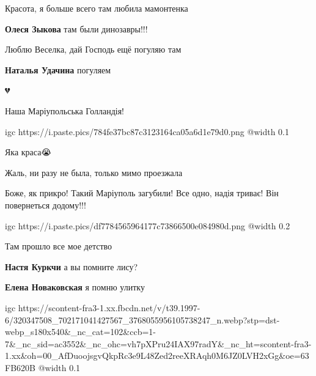  
 
 
 
 

\qqSecCmt


Красота, я больше всего там любила мамонтенка

\textbf{Олеся Зыкова} там были динозавры!!!


Люблю Веселка, дай Господь ещё погуляю там

\textbf{Наталья Удачина} погуляем

💔💙💛


Наша Маріупольська Голландія!

\ifcmt
  igc https://i.paste.pics/784fe37bc87c3123164ca05a6d1e79d0.png
	@width 0.1
\fi


Яка краса😭


Жаль, ни разу не была, только мимо проезжала


Боже, як прикро! Такий Маріуполь загубили! Все одно, надія триває! Він
повернеться додому!!!


\ifcmt
  igc https://i.paste.pics/df7784565964177c73866500e084980d.png
	@width 0.2
\fi


Там прошло все мое детство

\begin{itemize} %
\textbf{Настя Куркчи} а вы помните лису?

\textbf{Елена Новаковская} я помню улитку
\end{itemize} %


\ifcmt
  igc https://scontent-fra3-1.xx.fbcdn.net/v/t39.1997-6/320347508_702171041427567_3768055956105738247_n.webp?stp=dst-webp_s180x540&_nc_cat=102&ccb=1-7&_nc_sid=ac3552&_nc_ohc=vh7pXPru24IAX97radY&_nc_ht=scontent-fra3-1.xx&oh=00_AfDuoojsgvQkpRc3e9L48Zed2reeXRAqh0M6JZ0LVH2xGg&oe=63FB620B
	@width 0.1
\fi

